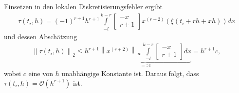Einsetzen in den lokalen Diskretisierungsfehler ergibt
\begin{align*}
    \tau(t_i,h) = (-1)^{r+1} h^{r+1} \int\limits_{-l}^{k-r} \begin{bmatrix} -x \\ r+1 \end{bmatrix}
    x^{(r+2)}(\xi(t_i+rh+xh))dx
\end{align*}
und dessen Abschätzung
\begin{align*}
    \left\lVert \tau(t_i,h) \right\rVert_2 \leq h^{r+1}
    \underbrace{
        \left\lVert x^{(r+2)}\right\rVert_{\infty}\int\limits_{-l}^{k-r} \begin{bmatrix} -x \\ r+1 \end{bmatrix} dx
    }_{=:c} = h^{r+1}c,
\end{align*}
wobei $c$ eine von $h$ unabhängige Konstante ist. Daraus folgt, dass $\tau(t_i, h)=\mathcal{O}(h^{r+1})$ ist. \qedwhite

